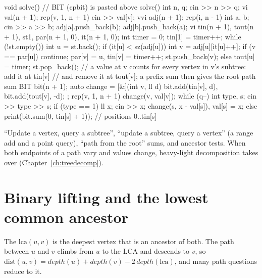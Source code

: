 \begin{code}
void solve() {  // BIT (cpbit) is pasted above solve()
    int n, q;
    cin >> n >> q;
    vi val(n + 1);
    rep(v, 1, n + 1) cin >> val[v];
    vvi adj(n + 1);
    rep(i, n - 1) {
        int a, b;
        cin >> a >> b;
        adj[a].push_back(b);
        adj[b].push_back(a);
    }
    vi tin(n + 1), tout(n + 1), st{1}, par(n + 1, 0), it(n + 1, 0);
    int timer = 0;
    tin[1] = timer++;
    while (!st.empty()) {
        int u = st.back();
        if (it[u] < sz(adj[u])) {
            int v = adj[u][it[u]++];
            if (v == par[u]) continue;
            par[v] = u, tin[v] = timer++;
            st.push_back(v);
        } else {
            tout[u] = timer;
            st.pop_back();
        }
    }
    // a value at v counts for every vertex in v's subtree: add it at tin[v]
    // and remove it at tout[v]; a prefix sum then gives the root path sum
    BIT bit(n + 1);
    auto change = [&](int v, ll d) {
        bit.add(tin[v], d), bit.add(tout[v], -d);
    };
    rep(v, 1, n + 1) change(v, val[v]);
    while (q--) {
        int type, s;
        cin >> type >> s;
        if (type == 1) {
            ll x;
            cin >> x;
            change(s, x - val[s]), val[s] = x;
        } else print(bit.sum(0, tin[s] + 1));  // positions 0..tin[s]
    }
}
\end{code}

\begin{recognize}
``Update a vertex, query a subtree'', ``update a subtree, query a vertex'' (a range add and a point query), ``path from the
root'' sums, and ancestor tests. When both endpoints of a path vary and values change, heavy-light decomposition takes over
(Chapter~\ref{ch:treedecomp}).
\end{recognize}

\section[Binary lifting and the LCA]{Binary lifting and the lowest common ancestor \hfill \gold}\label{sec:lca}

The  $\mathrm{lca}(u, v)$ is the deepest vertex that is an ancestor of both. The path between $u$ and
$v$ climbs from $u$ to the LCA and descends to $v$, so $\mathrm{dist}(u, v) = \mathit{depth}(u) + \mathit{depth}(v) -
2\,\mathit{depth}(\mathrm{lca})$, and many path questions reduce to it.


